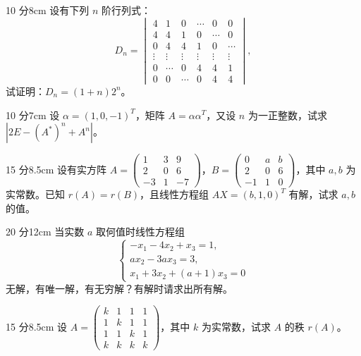 
\begin{problem}{10 分}{8cm}
设有下列 $n$ 阶行列式：
\[
D_n=\begin{vmatrix}
4&1&0&\cdots&0&0\\
4&4&1&0&\cdots&0\\
0&4&4&1&0&\cdots\\
\vdots&\vdots&\vdots&\vdots&\vdots&\vdots\\
0&\cdots&0&4&4&1\\
0&0&\cdots&0&4&4
\end{vmatrix},
\]
试证明：$D_n=(1+n)2^{n}$。
\end{problem}

\begin{problem}{10 分}{7cm}
设 $\alpha=(1,0,-1)^{T}$，矩阵 $A=\alpha\alpha^{T}$，又设 $n$ 为一正整数，试求 $|2E-(A^{*})^{n}+A^{n}|$。
\end{problem}

\begin{problem}{15 分}{8.5cm}
设有实方阵 $A=\begin{pmatrix}1&3&9\\2&0&6\\-3&1&-7\end{pmatrix}$，$B=\begin{pmatrix}0&a&b\\2&0&6\\-1&1&0\end{pmatrix}$，其中 $a,b$ 为实常数。已知 $r(A)=r(B)$，且线性方程组 $AX=(b,1,0)^{T}$ 有解，试求 $a,b$ 的值。
\end{problem}

\begin{problem}{20 分}{12cm}
当实数 $a$ 取何值时线性方程组
\[
\begin{cases}
-x_1-4x_2+x_3=1,\\
ax_2-3ax_3=3,\\
x_1+3x_2+(a+1)x_3=0
\end{cases}
\]
无解，有唯一解，有无穷解？有解时请求出所有解。
\end{problem}

\begin{problem}{15 分}{8.5cm}
设 $A=\begin{pmatrix}k&1&1&1\\1&k&1&1\\1&1&k&1\\k&k&k&k\end{pmatrix}$，其中 $k$ 为实常数，试求 $A$ 的秩 $r(A)$。
\end{problem}

